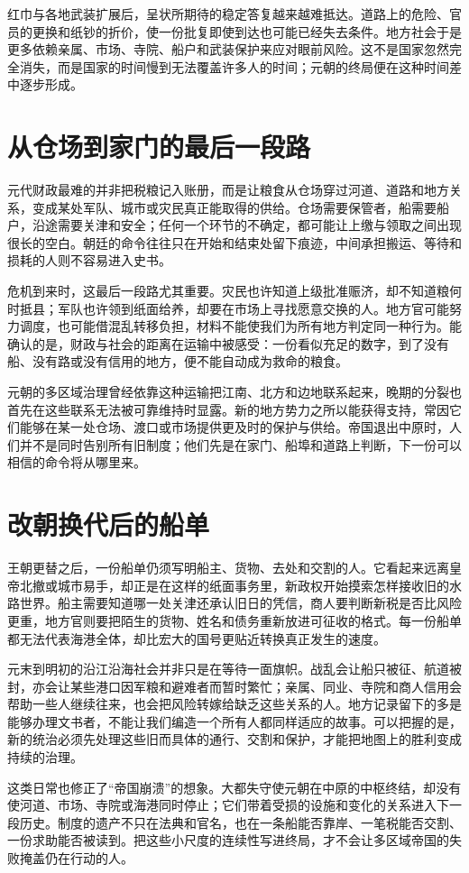 红巾与各地武装扩展后，呈状所期待的稳定答复越来越难抵达。道路上的危险、官员的更换和纸钞的折价，使一份批复即使到达也可能已经失去条件。地方社会于是更多依赖亲属、市场、寺院、船户和武装保护来应对眼前风险。这不是国家忽然完全消失，而是国家的时间慢到无法覆盖许多人的时间；元朝的终局便在这种时间差中逐步形成。

\section{从仓场到家门的最后一段路}

元代财政最难的并非把税粮记入账册，而是让粮食从仓场穿过河道、道路和地方关系，变成某处军队、城市或灾民真正能取得的供给。仓场需要保管者，船需要船户，沿途需要关津和安全；任何一个环节的不确定，都可能让上缴与领取之间出现很长的空白。朝廷的命令往往只在开始和结束处留下痕迹，中间承担搬运、等待和损耗的人则不容易进入史书。

危机到来时，这最后一段路尤其重要。灾民也许知道上级批准赈济，却不知道粮何时抵县；军队也许领到纸面给养，却要在市场上寻找愿意交换的人。地方官可能努力调度，也可能借混乱转移负担，材料不能使我们为所有地方判定同一种行为。能确认的是，财政与社会的距离在运输中被感受：一份看似充足的数字，到了没有船、没有路或没有信用的地方，便不能自动成为救命的粮食。

元朝的多区域治理曾经依靠这种运输把江南、北方和边地联系起来，晚期的分裂也首先在这些联系无法被可靠维持时显露。新的地方势力之所以能获得支持，常因它们能够在某一处仓场、渡口或市场提供更及时的保护与供给。帝国退出中原时，人们并不是同时告别所有旧制度；他们先是在家门、船埠和道路上判断，下一份可以相信的命令将从哪里来。

\section{改朝换代后的船单}

王朝更替之后，一份船单仍须写明船主、货物、去处和交割的人。它看起来远离皇帝北撤或城市易手，却正是在这样的纸面事务里，新政权开始摸索怎样接收旧的水路世界。船主需要知道哪一处关津还承认旧日的凭信，商人要判断新税是否比风险更重，地方官则要把陌生的货物、姓名和债务重新放进可征收的格式。每一份船单都无法代表海港全体，却比宏大的国号更贴近转换真正发生的速度。

元末到明初的沿江沿海社会并非只是在等待一面旗帜。战乱会让船只被征、航道被封，亦会让某些港口因军粮和避难者而暂时繁忙；亲属、同业、寺院和商人信用会帮助一些人继续往来，也会把风险转嫁给缺乏这些关系的人。地方记录留下的多是能够办理文书者，不能让我们编造一个所有人都同样适应的故事。可以把握的是，新的统治必须先处理这些旧而具体的通行、交割和保护，才能把地图上的胜利变成持续的治理。

这类日常也修正了“帝国崩溃”的想象。大都失守使元朝在中原的中枢终结，却没有使河道、市场、寺院或海港同时停止；它们带着受损的设施和变化的关系进入下一段历史。制度的遗产不只在法典和官名，也在一条船能否靠岸、一笔税能否交割、一份求助能否被读到。把这些小尺度的连续性写进终局，才不会让多区域帝国的失败掩盖仍在行动的人。
